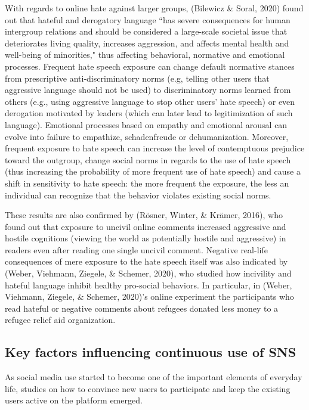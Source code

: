 \documentclass[
  10pt,
  dvipsnames]{scrartcl}
\begin{document}
With regards to online hate against larger groups, (Bilewicz \& Soral,
2020) found out that hateful and derogatory language ``has severe
consequences for human intergroup relations and should be considered a
large-scale societal issue that deteriorates living quality, increases
aggression, and affects mental health and well-being of minorities,"
thus affecting behavioral, normative and emotional processes. Frequent
hate speech exposure can change default normative stances from
prescriptive anti-discriminatory norms (e.g, telling other users that
aggressive language should not be used) to discriminatory norms learned
from others (e.g., using aggressive language to stop other users' hate
speech) or even derogation motivated by leaders (which can later lead to
legitimization of such language). Emotional processes based on empathy
and emotional arousal can evolve into failure to empathize,
schadenfreude or dehumanization. Moreover, frequent exposure to hate
speech can increase the level of contemptuous prejudice toward the
outgroup, change social norms in regards to the use of hate speech (thus
increasing the probability of more frequent use of hate speech) and
cause a shift in sensitivity to hate speech: the more frequent the
exposure, the less an individual can recognize that the behavior
violates existing social norms.

These results are also confirmed by (Rösner, Winter, \& Krämer, 2016),
who found out that exposure to uncivil online comments increased
aggressive and hostile cognitions (viewing the world as potentially
hostile and aggressive) in readers even after reading one single uncivil
comment. Negative real-life consequences of mere exposure to the hate
speech itself was also indicated by (Weber, Viehmann, Ziegele, \&
Schemer, 2020), who studied how incivility and hateful language inhibit
healthy pro-social behaviors. In particular, in (Weber, Viehmann,
Ziegele, \& Schemer, 2020)'s online experiment the participants who read
hateful or negative comments about refugees donated less money to a
refugee relief aid organization.

\subsection{Key factors  influencing continuous use of SNS}

As social media use started to become one of the important elements of
everyday life, studies on how to convince new users to participate and
keep the existing users active on the platform emerged.
\end{document}
